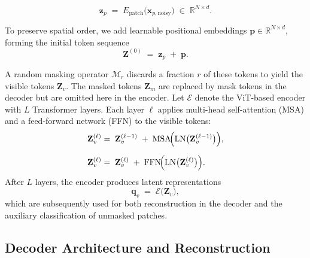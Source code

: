 \begin{equation}
\mathbf{z}_p \;=\; E_{\mathrm{patch}}\bigl(\mathbf{x}_{p,\text{noisy}}\bigr) 
\;\in\; 
\mathbb{R}^{N \times d}.
\label{eq:patch_embed}
\end{equation}

To preserve spatial order, we add learnable positional embeddings \(\mathbf{p} \in \mathbb{R}^{N \times d}\), forming the initial token sequence
\begin{equation}
\mathbf{Z}^{(0)} 
\;=\; 
\mathbf{z}_p 
\;+\; 
\mathbf{p}.
\label{eq:pos_embed}
\end{equation}

A random masking operator \(\mathcal{M}_{r}\) discards a fraction \(r\) of these tokens to yield the visible tokens \(\mathbf{Z}_{v}\). The masked tokens \(\mathbf{Z}_{m}\) are replaced by mask tokens in the decoder but are omitted here in the encoder. Let \(\mathcal{E}\) denote the ViT-based encoder with \(L\) Transformer layers. Each layer \(\ell\) applies multi-head self-attention (MSA) and a feed-forward network (FFN) to the visible tokens:
\begin{align}
\mathbf{Z}_{v}^{(\ell)} 
&=\; 
\mathbf{Z}_{v}^{(\ell-1)} 
\;+\;
\mathrm{MSA}
\!\Bigl(\mathrm{LN}\bigl(\mathbf{Z}_{v}^{(\ell-1)}\bigr)\Bigr),
\label{eq:msa}
\\[6pt]
\mathbf{Z}_{v}^{(\ell)} 
&=\; 
\mathbf{Z}_{v}^{(\ell)} 
\;+\;
\mathrm{FFN}
\!\Bigl(\mathrm{LN}\bigl(\mathbf{Z}_{v}^{(\ell)}\bigr)\Bigr).
\label{eq:ffn}
\end{align}
After \(L\) layers, the encoder produces latent representations
\begin{equation}
\mathbf{q}_{v} 
\;=\; 
\mathcal{E}\bigl(\mathbf{Z}_{v}\bigr),
\label{eq:encoder_output}
\end{equation}
which are subsequently used for both reconstruction in the decoder and the auxiliary classification of unmasked patches.


\subsection{Decoder Architecture and Reconstruction}


